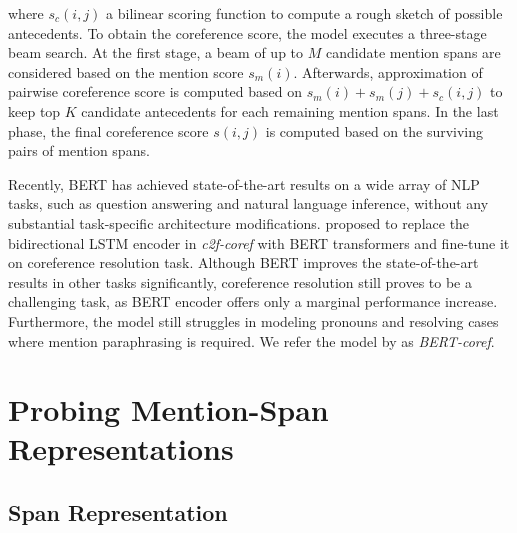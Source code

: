 \documentclass[11pt]{article}
\begin{document}
where $s_{c}(i, j)$ a bilinear scoring function to compute a rough sketch of possible antecedents. To obtain the coreference score, the model executes a three-stage beam search. At the first stage, a beam of up to $M$ candidate mention spans are considered based on the mention score $s_{m}(i)$. Afterwards,  approximation of pairwise coreference score is computed based on $s_{m}(i) + s_{m}(j) + s_{c}(i, j)$ to keep top $K$ candidate antecedents for each remaining mention spans. In the last phase, the final coreference score $s(i, j)$ is computed based on the surviving pairs of mention spans.

Recently, BERT \parencite{devlin2019bert} has achieved state-of-the-art results on a wide array of NLP tasks, such as question answering and natural language inference, without any substantial task-specific architecture modifications. \parencite{joshi2019coref} proposed to replace the bidirectional LSTM encoder in \textit{c2f-coref} with BERT transformers and fine-tune it on coreference resolution task. Although BERT improves the state-of-the-art results in other tasks significantly, coreference resolution still proves to be a challenging task, as BERT encoder offers only a marginal performance increase. Furthermore, the model still struggles in modeling pronouns and resolving cases where mention paraphrasing is required. We refer the model by \parencite{joshi2019coref} as \textit{BERT-coref}.


\section{Probing Mention-Span Representations}


\subsection{Span Representation}
\label{subsection:spanreps}
\end{document}
